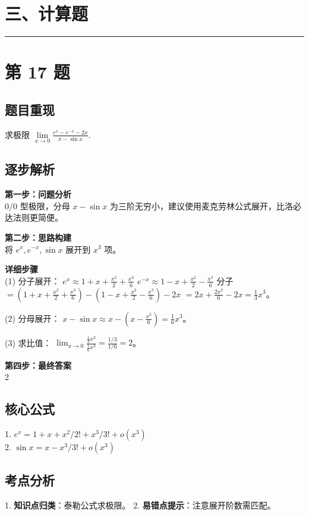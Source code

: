 \documentclass[10pt, a4paper]{ctexart}
\newcommand{\problemheader}{
    \vspace{0.5cm}
    \noindent\rule[0.5ex]{\linewidth}{2pt} %
}
\newcommand{\analysisheader}{
    \vspace{0.2cm}
    \noindent{\color{red}\rule[0.5ex]{\linewidth}{0.5pt}} %
    \vspace{0.1cm}
}
\begin{document}

\section*{三、计算题}

\problemheader
\section*{第 17 题}
\subsection*{题目重现}
求极限 $\lim\limits_{x \to 0} \frac{e^x - e^{-x} - 2x}{x - \sin x}$.

\analysisheader
{\color{red}
\subsection*{逐步解析}
\textbf{第一步：问题分析} \\
$0/0$ 型极限，分母 $x-\sin x$ 为三阶无穷小，建议使用麦克劳林公式展开，比洛必达法则更简便。

\textbf{第二步：思路构建} \\
将 $e^x, e^{-x}, \sin x$ 展开到 $x^3$ 项。

\textbf{详细步骤} \\
(1) 分子展开：
$e^x \approx 1 + x + \frac{x^2}{2} + \frac{x^3}{6}$
$e^{-x} \approx 1 - x + \frac{x^2}{2} - \frac{x^3}{6}$
分子 $= (1 + x + \frac{x^2}{2} + \frac{x^3}{6}) - (1 - x + \frac{x^2}{2} - \frac{x^3}{6}) - 2x$
$= 2x + \frac{2x^3}{6} - 2x = \frac{1}{3}x^3$。

(2) 分母展开：
$x - \sin x \approx x - (x - \frac{x^3}{6}) = \frac{1}{6}x^3$。

(3) 求比值：
$\lim_{x \to 0} \frac{\frac{1}{3}x^3}{\frac{1}{6}x^3} = \frac{1/3}{1/6} = 2$。

\textbf{第四步：最终答案} \\
2

\subsection*{核心公式}
1. $e^x = 1 + x + x^2/2! + x^3/3! + o(x^3)$ \\
2. $\sin x = x - x^3/3! + o(x^3)$

\subsection*{考点分析}
1. \textbf{知识点归类}：泰勒公式求极限。
2. \textbf{易错点提示}：注意展开阶数需匹配。
}
\end{document}
